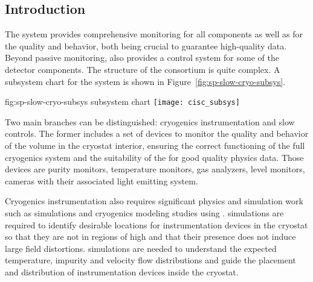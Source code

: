 \subsection{Introduction}
\label{sec:fdsp-slow-cryo-intro}



The  system provides comprehensive monitoring for all  components as well as for the \lar quality and behavior, both being crucial
to guarantee high-quality data. Beyond passive monitoring,  also provides a control system for some of the detector components. 
The structure of the  consortium is quite complex. A subsystem chart
for the  system is shown in Figure~\ref{fig:sp-slow-cryo-subsys}. 

\begin{dunefigure}{fig:sp-slow-cryo-subsys}
{ subsystem chart}
\texttt{[image: cisc\_subsys]}
\end{dunefigure}

Two main branches can be distinguished: cryogenics instrumentation and slow controls. The former includes a set of devices 
to monitor the quality and behavior of the \lar volume in the cryostat interior, ensuring the correct functioning of
the full cryogenics system and the suitability of the \lar for good quality physics data. Those devices are 
purity monitors, temperature monitors, gas analyzers, \lar level monitors, cameras with their associated
light emitting system.

Cryogenics instrumentation also requires significant physics and
simulation work such as \efield simulations and cryogenics modeling
studies using . \efield simulations
are required to identify desirable locations for instrumentation
devices in the cryostat so that they are not in regions of high \efield and
that their presence does not induce large field distortions. 
simulations are needed to understand the expected temperature,
impurity and velocity flow distributions and guide the placement and
distribution of instrumentation devices inside the cryostat.


